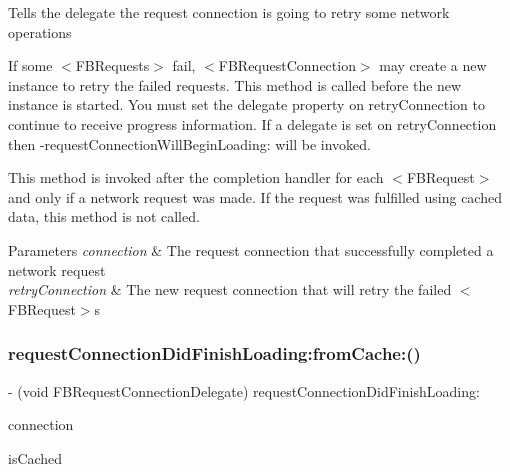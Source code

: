 Tells the delegate the request connection is going to retry some network operations

If some $<$\+F\+B\+Requests$>$ fail, $<$\+F\+B\+Request\+Connection$>$ may create a new instance to retry the failed requests. This method is called before the new instance is started. You must set the delegate property on {\ttfamily retry\+Connection} to continue to receive progress information. If a delegate is set on {\ttfamily retry\+Connection} then -\/request\+Connection\+Will\+Begin\+Loading\+: will be invoked.

This method is invoked after the completion handler for each $<$\+F\+B\+Request$>$ and only if a network request was made. If the request was fulfilled using cached data, this method is not called.


\begin{DoxyParams}{Parameters}
{\em connection} & The request connection that successfully completed a network request \\
\hline
{\em retry\+Connection} & The new request connection that will retry the failed $<$\+F\+B\+Request$>$s \\
\hline
\end{DoxyParams}
\mbox{\label{protocolFBRequestConnectionDelegate_01-p_ade2925bfe662c883d45fe849f332991f}} 
\subsubsection{\texorpdfstring{request\+Connection\+Did\+Finish\+Loading\+:from\+Cache\+:()}{requestConnectionDidFinishLoading:fromCache:()}\hspace{0.1cm}{\footnotesize\ttfamily [1/5]}}
{\footnotesize\ttfamily -\/ (void F\+B\+Request\+Connection\+Delegate) request\+Connection\+Did\+Finish\+Loading\+: \begin{DoxyParamCaption}\item[{(\hyperlink{interfaceFBRequestConnection}{F\+B\+Request\+Connection} $\ast$)}]{connection }\item[{fromCache:(B\+O\+OL)}]{is\+Cached }\end{DoxyParamCaption}\hspace{0.3cm}{\ttfamily [optional]}}

